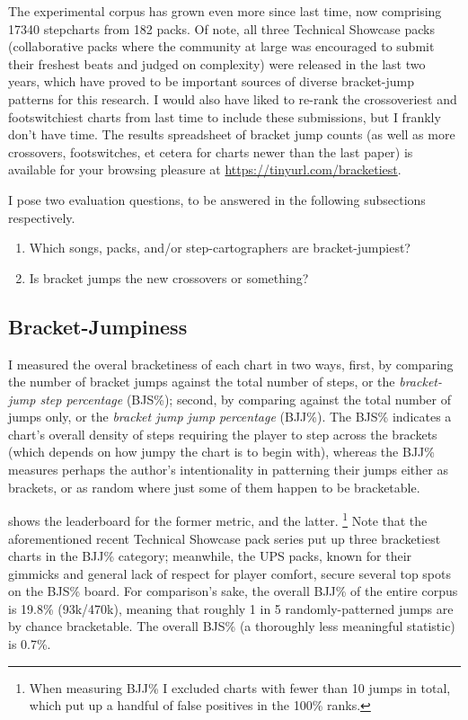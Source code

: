 \documentclass[10pt]{sigplanconf}
\begin{document}
The experimental corpus has grown even more since last time, now comprising %
17340 %
stepcharts from 182 packs.
Of note, all three Technical Showcase packs
(collaborative packs where the community at large was encouraged to submit their freshest beats and judged on complexity)
were released in the last two years,
which have proved to be important sources of diverse bracket-jump patterns for this research.
I would also have liked to re-rank the crossoveriest and footswitchiest charts from last time to include these submissions,
but I frankly don't have time.
The results spreadsheet of bracket jump counts
(as well as more crossovers, footswitches, et cetera for charts newer than the last paper)
is available for your browsing pleasure at
\url{https://tinyurl.com/bracketiest}.


I pose two evaluation questions, to be answered in the following subsections respectively.
\begin{enumerate}
	\item Which songs, packs, and/or step-cartographers are bracket-jumpiest?
	\item Is bracket jumps the new crossovers or something?
\end{enumerate}

\subsection{Bracket-Jumpiness}
\label{sec:bjness}

I measured the overal bracketiness of each chart in two ways,
first,
by comparing the number of bracket jumps against the total number of steps,
or the \textit{bracket-jump step percentage} (BJS\%);
second,
by comparing against the total number of jumps only,
or the \textit{bracket jump jump percentage} (BJJ\%).
The BJS\% indicates a chart's overall density of steps requiring the player to step across the brackets
(which depends on how jumpy the chart is to begin with),
whereas the BJJ\% measures perhaps the author's intentionality in patterning their jumps either as brackets,
or as random where just some of them happen to be bracketable.

 shows the leaderboard for the former metric, and  the latter.%
\footnote{When measuring BJJ\% I excluded charts with fewer than 10 jumps in total,
which put up a handful of false positives in the 100\% ranks.}
Note that the aforementioned recent Technical Showcase pack series put up three bracketiest charts in the BJJ\% category;
meanwhile, the UPS packs, known for their gimmicks and general lack of respect for player comfort,
secure several top spots on the BJS\% board.
For comparison's sake, the overall BJJ\% of the entire corpus is 19.8\% (93k/470k),
meaning that roughly 1 in 5 randomly-patterned jumps are by chance bracketable.
The overall BJS\% (a thoroughly less meaningful statistic) is 0.7\%.
\end{document}
